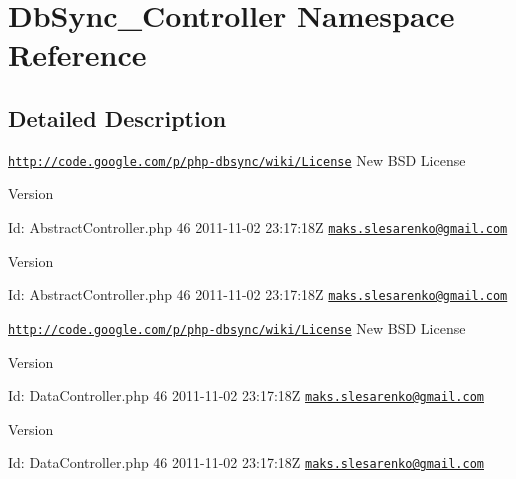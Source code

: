 \hypertarget{namespaceDbSync__Controller}{
\section{DbSync\_\-Controller Namespace Reference}
\label{namespaceDbSync__Controller}
}


\subsection{Detailed Description}
\href{http://code.google.com/p/php-dbsync/wiki/License}{\tt http://code.google.com/p/php-\/dbsync/wiki/License} New BSD License \begin{DoxyVersion}{Version}

\end{DoxyVersion}
\begin{DoxyParagraph}{Id:}
AbstractController.php 46 2011-\/11-\/02 23:17:18Z \href{mailto:maks.slesarenko@gmail.com}{\tt maks.slesarenko@gmail.com} 
\end{DoxyParagraph}


\begin{DoxyVersion}{Version}

\end{DoxyVersion}
\begin{DoxyParagraph}{Id:}
AbstractController.php 46 2011-\/11-\/02 23:17:18Z \href{mailto:maks.slesarenko@gmail.com}{\tt maks.slesarenko@gmail.com} 
\end{DoxyParagraph}


\href{http://code.google.com/p/php-dbsync/wiki/License}{\tt http://code.google.com/p/php-\/dbsync/wiki/License} New BSD License \begin{DoxyVersion}{Version}

\end{DoxyVersion}
\begin{DoxyParagraph}{Id:}
DataController.php 46 2011-\/11-\/02 23:17:18Z \href{mailto:maks.slesarenko@gmail.com}{\tt maks.slesarenko@gmail.com} 
\end{DoxyParagraph}


\begin{DoxyVersion}{Version}

\end{DoxyVersion}
\begin{DoxyParagraph}{Id:}
DataController.php 46 2011-\/11-\/02 23:17:18Z \href{mailto:maks.slesarenko@gmail.com}{\tt maks.slesarenko@gmail.com} 
\end{DoxyParagraph}


